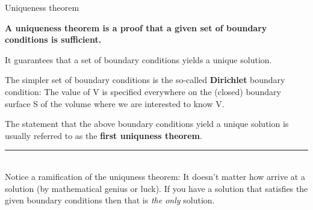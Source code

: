 %
%
%

\begin{frame}{Uniqueness theorem}

{\bf
 A uniqueness theorem is a proof that a given set of boundary conditions is sufficient.
}
\begin{itemize}
{\small
  \item It guarantees that a set of boundary conditions yields a unique solution.
}
\end{itemize}

\vspace{0.2cm}

The simpler set of boundary conditions
is the so-called {\bf Dirichlet} boundary condition:
The value of V is specified everywhere on the (closed) boundary surface S
of the volume where we are interested to know V.
\begin{itemize}
{\small
  \item The statement that the above boundary conditions yield a unique solution
         is usually referred to as the {\bf first uniquness theorem}.
}
\end{itemize}

\vspace{0.4cm}

\noindent\rule{2cm}{0.4pt}\\
{\small
Notice a ramification of the uniquness theorem:
It doesn't matter how arrive at a solution (by mathematical genius or luck).
If you have a solution that satisfies the given boundary conditions
then that is {\em the only} solution.\\
}

\end{frame}

%
%
%

